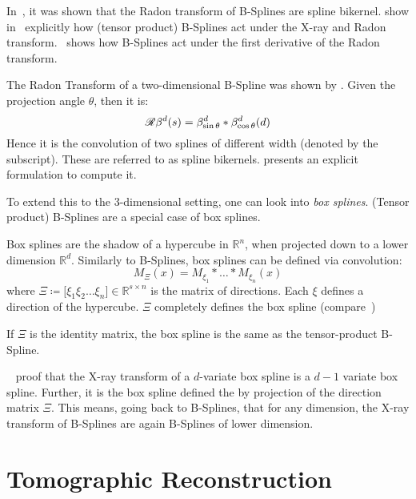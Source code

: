 In~\cite{horbelt_discretization_2002}, it was shown that the Radon transform of B-Splines are spline
bikernel. \citeauthor*{entezari_box_2012} show in~\cite{entezari_box_2012} explicitly how (tensor
product) B-Splines act under the X-ray and Radon transform.~\cite{nilchian_differential_2012} shows
how B-Splines act under the first derivative of the Radon transform.

The Radon Transform of a two-dimensional B-Spline was shown by
\citeauthor*{horbelt_discretization_2002}\cite{horbelt_discretization_2002}. Given the projection
angle \(\theta\), then it is:
\begin{equation}
	\mathscr{R}\beta^d(s) = \beta^d_{\sin\theta} * \beta^d_{\cos\theta}(d)
\end{equation}
Hence it is the convolution of two splines of different width (denoted by the subscript). These are
referred to as spline bikernels. \citeauthor*{horbelt_discretization_2002} presents an explicit
formulation to compute it.

To extend this to the \(3\)-dimensional setting, one can look into \textit{box splines}. (Tensor
product) B-Splines are a special case of box splines.
\begin{definition}\label{def:box_splines}
	Box splines are the shadow of a hypercube in \(\mathbb{R}^n\), when projected down to a
	lower dimension \(\mathbb{R}^d\). Similarly to B-Splines, box splines can be defined via
	convolution:
	\begin{equation}
		M_\Xi(x) = M_{\xi_1} * \dots * M_{\xi_n}(x)
	\end{equation}
	where \(\Xi \coloneq \mathopen[ \xi_1 \xi_2 \dots \xi_n \mathclose] \in \mathbb{R}^{s \times n}\)
	is the matrix of directions. Each \(\xi\) defines a direction of the hypercube.
	\(\Xi\) completely defines the box spline (compare~\cite{de_boor_box_1993})
\end{definition}
If \(\Xi\) is the identity matrix, the box spline is the same as the tensor-product B-Spline.

\citeauthor*{entezari_box_2012}~\cite{entezari_box_2012} proof that the X-ray transform of a
\(d\)-variate box spline is a \(d - 1\) variate box spline. Further, it is the box spline defined
the by projection of the direction matrix \(\Xi\). This means, going back to B-Splines, that for any
dimension, the X-ray transform of B-Splines are again B-Splines of lower dimension.

\chapter{Tomographic Reconstruction}\label{chap:tomographic_reconstruction}

